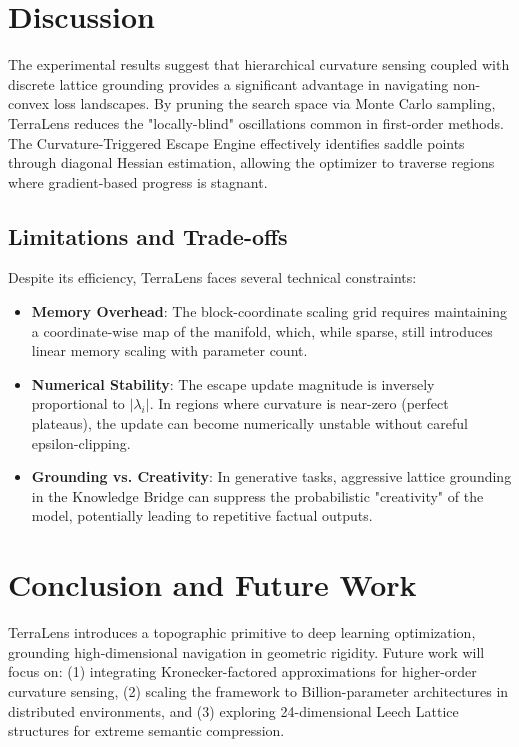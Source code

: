 \documentclass[10pt,twocolumn,letterpaper]{article}
\begin{document}
\section{Discussion}
The experimental results suggest that hierarchical curvature sensing coupled with discrete lattice grounding provides a significant advantage in navigating non-convex loss landscapes. By pruning the search space via Monte Carlo sampling, TerraLens reduces the "locally-blind" oscillations common in first-order methods. The Curvature-Triggered Escape Engine effectively identifies saddle points through diagonal Hessian estimation, allowing the optimizer to traverse regions where gradient-based progress is stagnant.

\subsection{Limitations and Trade-offs}
Despite its efficiency, TerraLens faces several technical constraints:
\begin{itemize}
    \item \textbf{Memory Overhead}: The block-coordinate scaling grid requires maintaining a coordinate-wise map of the manifold, which, while sparse, still introduces linear memory scaling with parameter count.
    \item \textbf{Numerical Stability}: The escape update magnitude is inversely proportional to $|\lambda_i|$. In regions where curvature is near-zero (perfect plateaus), the update can become numerically unstable without careful epsilon-clipping.
    \item \textbf{Grounding vs. Creativity}: In generative tasks, aggressive lattice grounding in the Knowledge Bridge can suppress the probabilistic "creativity" of the model, potentially leading to repetitive factual outputs.
\end{itemize}

\section{Conclusion and Future Work}
TerraLens introduces a topographic primitive to deep learning optimization, grounding high-dimensional navigation in geometric rigidity. Future work will focus on: (1) integrating Kronecker-factored approximations for higher-order curvature sensing, (2) scaling the framework to Billion-parameter architectures in distributed environments, and (3) exploring 24-dimensional Leech Lattice structures for extreme semantic compression.
\end{document}
